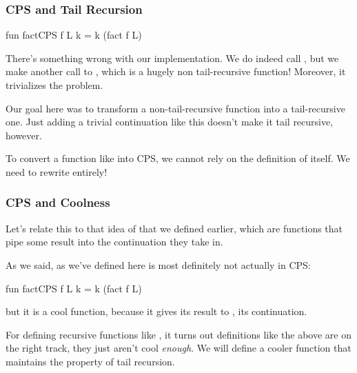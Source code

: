 \documentclass[aspectratio=169, handout]{beamer}
\begin{document}
\begin{frame}[fragile]
  \frametitle{CPS and Tail Recursion}

  \begin{codeblock}
    fun factCPS f L k = k (fact f L)
  \end{codeblock}

  \pause
  \vspace{\fill}


  \pause
  \vspace{\fill}

  There's something wrong with our implementation. We do indeed call
  , but we make another call to , which is a hugely
  non tail-recursive function! Moreover, it trivializes the problem.

  \pause
  \vspace{\fill}

  Our goal here was to transform a non-tail-recursive function into
  a tail-recursive one. Just adding a trivial continuation
  like this doesn't make it tail recursive, however.

  \pause
  \vspace{\fill}

  To convert a function like  into CPS, we cannot rely on the
  definition of  itself. We need to rewrite  entirely!
\end{frame}

\begin{frame}[fragile]
  \frametitle{CPS and Coolness}

  Let's relate this to that idea of  that we defined earlier,
  which are functions that pipe some result into the continuation they take in.

  \pause
  \vspace{\fill}

  As we said,  as we've defined here is most definitely not
  actually in CPS:
  \begin{codeblock}
    fun factCPS f L k = k (fact f L)
  \end{codeblock}
  but it is a cool function, because it gives its result to , its
  continuation.

  \pause
  \vspace{\fill}


  \pause
  \vspace{\fill}

  For defining recursive functions like , it turns out definitions
  like the above are on the right track, they just aren't cool \textit{enough}.
  We will define a cooler function that maintains the property of tail recursion.
\end{frame}
\end{document}
